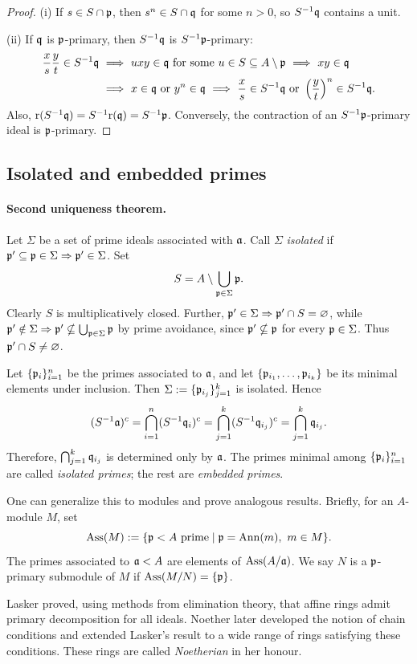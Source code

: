 \documentclass[11pt,a4paper]{article}
\begin{document}
\begin{proof}
(i) If $s\in S\cap\pp$, then $s^n\in S\cap\qq$ for some $n>0$, so $S^{-1}\qq$ contains a unit.

(ii) If $\qq$ is $\pp$-primary, then $S^{-1}\qq$ is $S^{-1}\pp$-primary:
\[
\begin{aligned}
\frac xs\frac yt\in S^{-1}\qq
&\ \Longrightarrow\ uxy\in\qq\text{ for some }u\in S\subseteq A\setminus\pp
\ \Longrightarrow\ xy\in\qq\\
&\ \Longrightarrow\ x\in\qq\text{ or }y^n\in\qq
\ \Longrightarrow\ \frac xs\in S^{-1}\qq\text{ or }\left(\frac yt\right)^n\in S^{-1}\qq.
\end{aligned}
\]
Also, $\rad(S^{-1}\qq)=S^{-1}\rad(\qq)=S^{-1}\pp$. Conversely, the contraction of an $S^{-1}\pp$-primary ideal is $\pp$-primary.
\end{proof}
\subsection{Isolated and embedded primes}
\paragraph{Second uniqueness theorem.}
Let $\Sigma$ be a set of prime ideals associated with $\aa$. Call $\Sigma$ \emph{isolated} if $\pp'\subseteq\pp\in\Sigma\Rightarrow\pp'\in\Sigma$. Set
\[S=A\setminus\bigcup_{\pp\in\Sigma}\pp.\]
Clearly $S$ is multiplicatively closed. Further, $\pp'\in\Sigma\Rightarrow\pp'\cap S=\varnothing$, while $\pp'\notin\Sigma\Rightarrow\pp'\nsubseteq\bigcup_{\pp\in\Sigma}\pp$ by prime avoidance, since $\pp'\nsubseteq\pp$ for every $\pp\in\Sigma$. Thus $\pp'\cap S\ne\varnothing$.

Let $\{\pp_i\}_{i=1}^n$ be the primes associated to $\aa$, and let $\{\pp_{i_1},\ldots,\pp_{i_k}\}$ be its minimal elements under inclusion. Then $\Sigma:=\{\pp_{i_j}\}_{j=1}^k$ is isolated. Hence
\[
(S^{-1}\aa)^c
=\bigcap_{i=1}^n(S^{-1}\qq_i)^c
=\bigcap_{j=1}^k(S^{-1}\qq_{i_j})^c
=\bigcap_{j=1}^k\qq_{i_j}.
\]
Therefore, $\bigcap_{j=1}^k\qq_{i_j}$ is determined only by $\aa$. The primes minimal among $\{\pp_i\}_{i=1}^n$ are called \emph{isolated primes}; the rest are \emph{embedded primes}.
\begin{remark}
One can generalize this to modules and prove analogous results. Briefly, for an $A$-module $M$, set
\[
\Ass(M):=\{\pp<A\text{ prime}\mid\pp=\Ann(m),\ m\in M\}.
\]
The primes associated to $\aa<A$ are elements of $\Ass(A/\aa)$. We say $N$ is a $\pp$-primary submodule of $M$ if $\Ass(M/N)=\{\pp\}$.
\end{remark}
Lasker proved, using methods from elimination theory, that affine rings admit primary decomposition for all ideals. Noether later developed the notion of chain conditions and extended Lasker's result to a wide range of rings satisfying these conditions. These rings are called \emph{Noetherian} in her honour.
\end{document}
